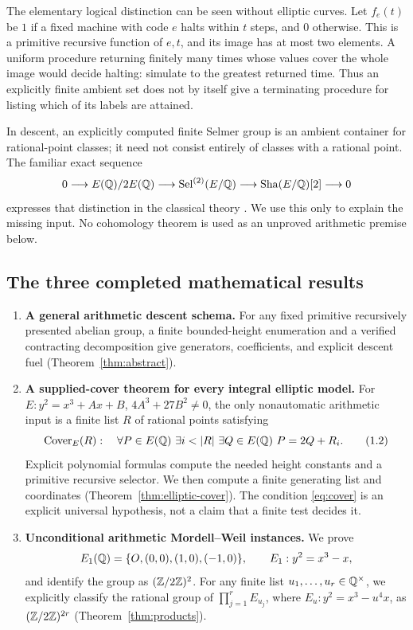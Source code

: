 The elementary logical distinction can be seen without elliptic curves.
Let $f_e(t)$ be $1$ if a fixed machine with code $e$ halts within $t$
steps, and $0$ otherwise. This is a primitive recursive function of $e,t$,
and its image has at most two elements. A uniform procedure returning
finitely many times whose values cover the whole image would decide
halting: simulate to the greatest returned time. Thus an explicitly finite
ambient set does not by itself give a terminating procedure for listing
which of its labels are attained.

In descent, an explicitly computed finite Selmer group is an ambient
container for rational-point classes; it need not consist entirely of
classes with a rational point. The familiar exact sequence
\[
0\longrightarrow E(\mathbb Q)/2E(\mathbb Q)
 \longrightarrow \operatorname{Sel}^{(2)}(E/\mathbb Q)
 \longrightarrow \operatorname{Sha}(E/\mathbb Q)[2]\longrightarrow0
\]
expresses that distinction in the classical theory \cite{milne}.
We use this only to explain the missing input. No cohomology theorem is
used as an unproved arithmetic premise below.

\subsection{The three completed mathematical results}

\begin{enumerate}
\item \textbf{A general arithmetic descent schema.}
For any fixed primitive recursively presented abelian group, a finite
bounded-height enumeration and a verified contracting decomposition give
generators, coefficients, and explicit descent fuel
(Theorem~\ref{thm:abstract}).

\item \textbf{A supplied-cover theorem for every integral elliptic model.}
For $E:y^2=x^3+Ax+B$, $4A^3+27B^2\ne0$, the only nonautomatic arithmetic
input is a finite list $R$ of rational points satisfying
\[
 \Cover_E(R):\quad
 \forall P\in E(\Q)\ \exists i<|R|\ \exists Q\in E(\Q)\
       P=2Q+R_i.
 \tag{1.2}\label{eq:cover}
\]
Explicit polynomial formulas compute the needed height constants and
a primitive recursive selector. We then compute a finite generating list
and coordinates (Theorem~\ref{thm:elliptic-cover}). The condition
\eqref{eq:cover} is an explicit universal hypothesis, not a claim that a
finite test decides it.

\item \textbf{Unconditional arithmetic Mordell--Weil instances.}
We prove
\[
 E_1(\mathbb Q)=\{O,(0,0),(1,0),(-1,0)\},\qquad E_1:y^2=x^3-x,
\]
and identify the group as $(\mathbb Z/2\mathbb Z)^2$. For any finite list
$u_1,\ldots,u_r\in\mathbb Q^\times$, we explicitly classify the rational group
of $\prod_{j=1}^r E_{u_j}$, where
$E_u:y^2=x^3-u^4x$, as $(\mathbb Z/2\mathbb Z)^{2r}$
(Theorem~\ref{thm:products}).
\end{enumerate}

